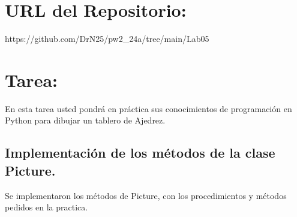 \documentclass{article}
\begin{document}
\section{URL del Repositorio:}
https://github.com/DrN25/pw2\_24a/tree/main/Lab05
	
\section{Tarea:}
En esta tarea usted pondrá en práctica sus conocimientos de programación en Python para dibujar un tablero de Ajedrez.
\subsection*{Implementación de los métodos de la clase Picture.}
Se implementaron los métodos de Picture, con los procedimientos y métodos pedidos en la practica.
\end{document}
